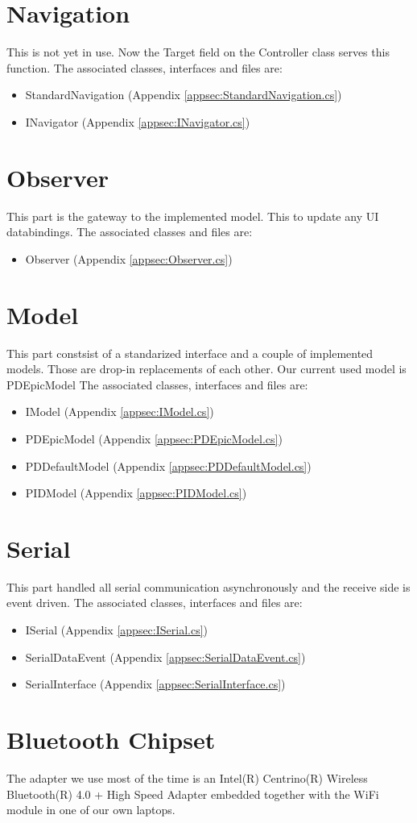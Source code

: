 \documentclass[final]{scrreprt} %
\begin{document}
\section{Navigation}
This is not yet in use. Now the Target field on the Controller class serves this function.
The associated classes, interfaces and files are:
\begin{itemize}
\item StandardNavigation (Appendix \ref{appsec:StandardNavigation.cs})
\item INavigator (Appendix \ref{appsec:INavigator.cs})
\end{itemize}
\section{Observer}
This part is the gateway to the implemented model. This to update any UI databindings.
The associated classes and files are:
\begin{itemize}
\item Observer (Appendix \ref{appsec:Observer.cs})
\end{itemize}
\section{Model}
This part constsist of a standarized interface and a couple of implemented models.
Those are drop-in replacements of each other.
Our current used model is PDEpicModel
The associated classes, interfaces and files are:
\begin{itemize}
\item IModel (Appendix \ref{appsec:IModel.cs})
\item PDEpicModel (Appendix \ref{appsec:PDEpicModel.cs})
\item PDDefaultModel (Appendix \ref{appsec:PDDefaultModel.cs})
\item PIDModel (Appendix \ref{appsec:PIDModel.cs})
\end{itemize}
\section{Serial}
This part handled all serial communication asynchronously and the receive side is event driven.
The associated classes, interfaces and files are:
\begin{itemize}
\item ISerial (Appendix \ref{appsec:ISerial.cs})
\item SerialDataEvent (Appendix \ref{appsec:SerialDataEvent.cs})
\item SerialInterface (Appendix \ref{appsec:SerialInterface.cs})
\end{itemize}
\section{Bluetooth Chipset}
The adapter we use most of the time is an Intel(R) Centrino(R) Wireless Bluetooth(R) 4.0 + High Speed Adapter embedded together with the WiFi module in one of our own laptops.
\end{document}
